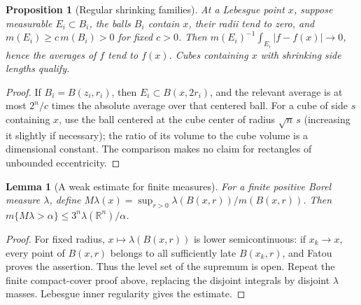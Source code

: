 \documentclass[11pt,oneside,openany]{book}
\newtheorem{lemma}[theorem]{Lemma}
\newtheorem{proposition}[theorem]{Proposition}
\theoremstyle{definition}
\theoremstyle{remark}
\newcommand{\R}{\mathbb R}\newcommand{\C}{\mathbb C}
\newcommand{\family}[1]{}
\begin{document}
\begin{proposition}[Regular shrinking families]\family{D11.13.regular_shrinking}\label{d11:13:regular-shrinking}
At a Lebesgue point $x$, suppose measurable $E_i\subset B_i$, the balls
$B_i$ contain $x$, their radii tend to zero, and
$m(E_i)\geq c\,m(B_i)>0$ for fixed $c>0$. Then
$m(E_i)^{-1}\int_{E_i}|f-f(x)|\to0$, hence the averages of $f$ tend to
$f(x)$. Cubes containing $x$ with shrinking side lengths qualify.
\end{proposition}
\begin{proof}
If $B_i=B(z_i,r_i)$, then $E_i\subset B(x,2r_i)$, and the relevant
average is at most $2^n/c$ times the absolute average over that centered
ball. For a cube of side $s$ containing $x$, use the ball centered at the
cube center of radius $\sqrt n\,s$ (increasing it slightly if necessary);
the ratio of its volume to the cube volume is a dimensional constant.
The comparison makes no claim for rectangles of unbounded eccentricity.
\end{proof}

\begin{lemma}[A weak estimate for finite measures]\label{d11:13:measure-weak-bound}
For a finite positive Borel measure $\lambda$, define
$M\lambda(x)=\sup_{r>0}\lambda(B(x,r))/m(B(x,r))$.
Then $m\{M\lambda>\alpha\}\leq3^n\lambda(\R^n)/\alpha$.
\end{lemma}
\begin{proof}
For fixed radius, $x\mapsto\lambda(B(x,r))$ is lower semicontinuous:
if $x_k\to x$, every point of $B(x,r)$ belongs to all sufficiently late
$B(x_k,r)$, and Fatou proves the assertion. Thus the level set of the
supremum is open. Repeat the finite compact-cover proof above, replacing
the disjoint integrals by disjoint $\lambda$ masses. Lebesgue inner
regularity gives the estimate.
\end{proof}
\end{document}
